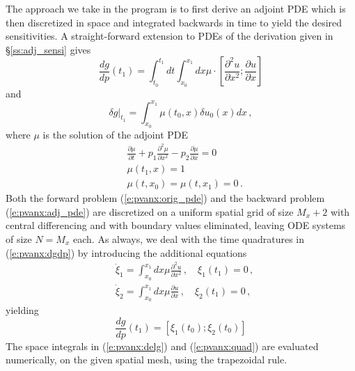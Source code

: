 The approach we take in the program  is to first derive an 
adjoint PDE which is then discretized in space and integrated backwards
in time to yield the desired sensitivities. A straight-forward extension 
to PDEs of the derivation given in \S\ref{ss:adj_sensi} gives
\begin{equation}\label{e:pvanx:dgdp}
  \frac{dg}{dp} (t_1) = \int_{t_0}^{t_1} dt 
  \int_{x_0}^{x_1} dx \mu \cdot 
  \left[
    \frac{\partial^2 u}{\partial x^2} ;
    \frac{\partial u}{\partial x}
  \right ]
\end{equation}
and
\begin{equation}\label{e:pvanx:delg}
  \delta g |_{t_1} = \int_{x_0}^{x_1} \mu(t_0,x) \delta u_0(x) dx \, , 
\end{equation}
where $\mu$ is the solution of the adjoint PDE
\begin{equation}\label{e:pvanx:adj_pde}
  \begin{split}
    & \frac{\partial \mu}{\partial t} + p_1 \frac{\partial^2 \mu}{\partial x^2} 
    - p_2 \frac{\partial \mu}{\partial x} = 0 \\
    & \mu(t_1 , x) = 1 \\
    & \mu(t , x_0) = \mu( t , x_1 ) = 0 \, .
  \end{split}
\end{equation}
Both the forward problem (\ref{e:pvanx:orig_pde}) and the backward problem 
(\ref{e:pvanx:adj_pde}) are discretized on a uniform spatial grid of size
$M_x + 2$ with central differencing and with boundary values eliminated,
leaving ODE systems of size $N = M_x$ each. 
As always, we deal with the time quadratures in (\ref{e:pvanx:dgdp}) by introducing
the additional equations
\begin{equation}\label{e:pvanx:quad}
  \begin{split}
    &{\dot\xi}_1 = \int_{x_0}^{x_1} dx \mu \frac{\partial^2 u}{\partial x^2} \, , \quad
    \xi_1(t_1) = 0 \, , \\
    &{\dot\xi}_2 = \int_{x_0}^{x_1} dx \mu \frac{\partial u}{\partial x} \, , \quad
    \xi_2(t_1) = 0 \, ,
  \end{split}
\end{equation}
yielding
\begin{equation*}
  \frac{dg}{dp} (t_1) = \left[ \xi_1(t_0) ; \xi_2(t_0) \right ]
\end{equation*}
The space integrals in (\ref{e:pvanx:delg}) and (\ref{e:pvanx:quad}) are
evaluated numerically, on the given spatial mesh, using the trapezoidal rule.

